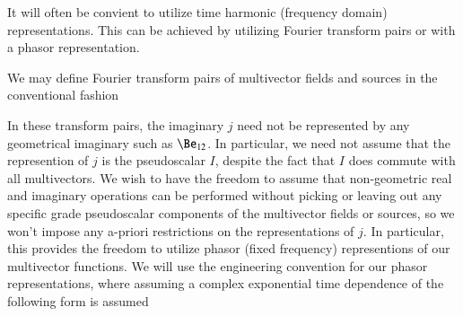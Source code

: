 %
%
\label{fourier}
It will often be convient to utilize time harmonic (frequency domain) representations.
This can be achieved by utilizing Fourier transform pairs or with a phasor representation.

We may define Fourier transform pairs of multivector fields and sources in the conventional fashion


In these transform pairs, the imaginary \( j \) need not be represented by any geometrical imaginary such as \( \Be_{12} \).
In particular, we need not assume that the represention of \( j \) is the
 pseudoscalar \( I \), despite the fact that \( I \) does commute with all  multivectors.
We wish to have the freedom to
assume that non-geometric real and imaginary operations can be performed without picking or leaving out any specific grade pseudoscalar components of the multivector fields or sources, so we won't impose any a-priori restrictions on the representations of \( j \).
In particular, this provides the freedom to utilize phasor (fixed frequency) representions of our multivector functions.
We will use the engineering convention for our
phasor representations, where assuming a complex exponential time dependence of the following form is assumed


